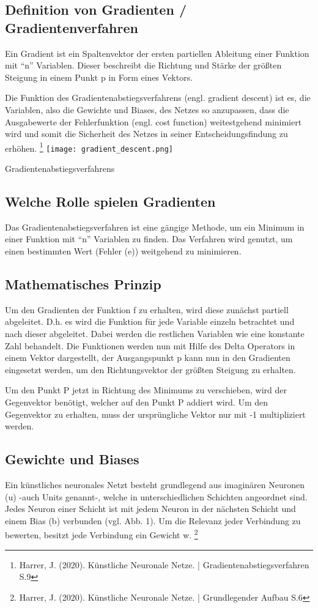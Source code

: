 \documentclass[a4paper,12pt,oneside]{article}
\begin{document}
  \subsection{Definition von Gradienten / Gradientenverfahren}\label{Definition_von_Gradienten}
  Ein Gradient ist ein Spaltenvektor der ersten partiellen Ableitung einer Funktion mit “n” Variablen. Dieser beschreibt die Richtung und Stärke der größten Steigung in einem Punkt p in Form eines Vektors.
  
  Die Funktion des Gradientenabstiegsverfahrens (engl. gradient descent) ist es, die Variablen, also die Gewichte und Biases, des Netzes so anzupassen, dass die Ausgabewerte
  der Fehlerfunktion (engl. cost function) weitestgehend minimiert wird und somit die Sicherheit des Netzes in seiner Entscheidungsfindung zu erhöhen.\cite{JH01} \footnote[JH01]{Harrer, J. (2020). Künstliche Neuronale Netze. | Gradientenabstiegsverfahren S.9}
  \texttt{[image: gradient\_descent.png]}
  \caption{Gradientenabstiegsverfahrens}

  \subsection{Welche Rolle spielen Gradienten}\label{Rolle_der_Gradienten}
  Das Gradientenabstiegsverfahren ist eine gängige Methode, um ein Minimum in einer Funktion mit “n” Variablen zu finden. Das Verfahren wird genutzt, um einen bestimmten Wert (Fehler (e)) weitgehend zu minimieren.

  \subsection{Mathematisches Prinzip}\label{Mathematisches_Prinzip}
  Um den Gradienten der Funktion f zu erhalten, wird diese zunächst partiell abgeleitet. D.h. es wird die Funktion für jede Variable einzeln betrachtet und nach dieser abgeleitet. Dabei werden die restlichen Variablen wie eine konstante Zahl behandelt.
  Die Funktionen werden nun mit Hilfe des Delta Operators in einem Vektor dargestellt, der Ausgangspunkt p kann nun in den Gradienten eingesetzt werden, um den Richtungsvektor der größten Steigung zu erhalten.

  Um den Punkt P jetzt in Richtung des Minimums zu verschieben, wird der Gegenvektor benötigt, welcher auf den Punkt P addiert wird. Um den Gegenvektor zu erhalten, muss
  der ursprüngliche Vektor nur mit -1 multipliziert werden.

  \subsection{Gewichte und Biases}\label{Gewichte_und_Biases}
  Ein künstliches neuronales Netzt besteht grundlegend aus imaginären Neuronen (u) -auch Units genannt-, welche in unterschiedlichen Schichten angeordnet sind. Jedes Neuron einer Schicht ist mit jedem Neuron in der nächsten Schicht und einem Bias (b) verbunden (vgl. Abb. 1). Um die Relevanz jeder Verbindung zu bewerten, besitzt jede Verbindung ein Gewicht w.
  \footnote[JH01]{Harrer, J. (2020). Künstliche Neuronale Netze. | Grundlegender Aufbau S.6
  }
  \newpage
\end{document}

